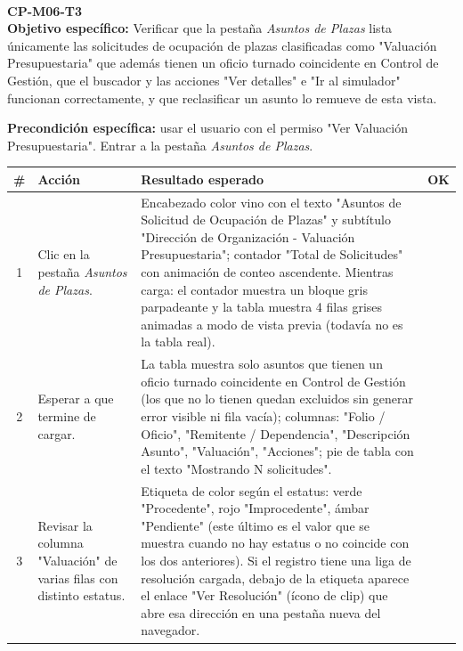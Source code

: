 \documentclass[11pt]{article}
\newcommand{\subcaso}[2]{%
  \vspace{10pt}
  \noindent{\color{vino}\rule{\linewidth}{2.2pt}}\\[4pt]
  {\Large\color{vino}\textbf{#1}} \quad {\large\color{oro}\textbf{#2}}\\[4pt]
}
\newcommand{\chk}[1]{\CheckBox[name=#1,width=11pt,height=11pt,bordercolor=grisborde,backgroundcolor=1 1 1]{}}
\begin{document}
\begin{Form}
\subcaso{CP-M06-T3}{Asuntos de Plazas}

\textbf{Objetivo específico:} Verificar que la pestaña \emph{Asuntos de Plazas} lista únicamente las
solicitudes de ocupación de plazas clasificadas como "Valuación Presupuestaria" que además tienen
un oficio turnado coincidente en Control de Gestión, que el buscador y las acciones "Ver detalles"
e "Ir al simulador" funcionan correctamente, y que reclasificar un asunto lo remueve de esta vista.

\vspace{4pt}\noindent\textbf{Precondición específica:} usar el usuario con el permiso "Ver
Valuación Presupuestaria". Entrar a la pestaña \emph{Asuntos de Plazas}.

\begingroup\small
\begin{longtable}{|c|p{6.7cm}|p{6.7cm}|c|}
\hline
\rowcolor{grisclaro}
\textbf{\#} & \textbf{Acción} & \textbf{Resultado esperado} & \textbf{OK} \\ \hline
\endhead

1 &
Clic en la pestaña \emph{Asuntos de Plazas}. &
Encabezado color vino con el texto "Asuntos de Solicitud de Ocupación de Plazas" y subtítulo
"Dirección de Organización - Valuación Presupuestaria"; contador "Total de Solicitudes" con
animación de conteo ascendente. Mientras carga: el contador muestra un bloque gris parpadeante y la
tabla muestra 4 filas grises animadas a modo de vista previa (todavía no es la tabla real). &
\chk{t3r1} \\ \hline

2 &
Esperar a que termine de cargar. &
La tabla muestra solo asuntos que tienen un oficio turnado coincidente en Control de Gestión (los
que no lo tienen quedan excluidos sin generar error visible ni fila vacía); columnas: "Folio /
Oficio", "Remitente / Dependencia", "Descripción Asunto", "Valuación", "Acciones"; pie de tabla con
el texto "Mostrando N solicitudes". &
\chk{t3r2} \\ \hline

3 &
Revisar la columna "Valuación" de varias filas con distinto estatus. &
Etiqueta de color según el estatus: verde "Procedente", rojo "Improcedente", ámbar "Pendiente"
(este último es el valor que se muestra cuando no hay estatus o no coincide con los dos
anteriores). Si el registro tiene una liga de resolución cargada, debajo de la etiqueta aparece el
enlace "Ver Resolución" (ícono de clip) que abre esa dirección en una pestaña nueva del navegador. &
\chk{t3r3} \\ \hline


\end{longtable}
\end{Form}
\end{document}
